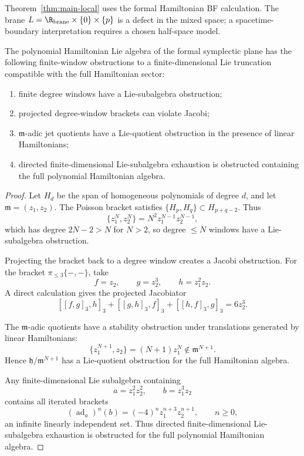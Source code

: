\documentclass[11pt]{memoir}
\begin{document}
\begin{rmk}
  Theorem~\ref{thm:main-local} uses the formal Hamiltonian BF
  calculation.  The brane
  \(L=\R_{\mathrm{brane}}\times\{0\}\times\{p\}\) is a defect in the
  mixed space; a spacetime-boundary interpretation requires a chosen
  half-space model.
\end{rmk}

\begin{lem}\label{lem:finite-window-hamiltonian-obstruction}
  The polynomial Hamiltonian Lie algebra of the formal symplectic plane has
  the following finite-window obstructions to a finite-dimensional Lie
  truncation compatible with the full Hamiltonian sector:
  \begin{enumerate}
    \item finite degree windows have a Lie-subalgebra obstruction;
    \item projected degree-window brackets can violate Jacobi;
    \item $\mathfrak m$-adic jet quotients have a Lie-quotient obstruction in the
      presence of linear Hamiltonians;
    \item directed finite-dimensional Lie-subalgebra exhaustion is obstructed
      containing the full polynomial Hamiltonian algebra.
  \end{enumerate}
\end{lem}

\begin{proof}
  Let $H_d$ be the span of homogeneous polynomials of degree $d$, and let
  $\mathfrak m=(z_1,z_2)$. The Poisson bracket satisfies
  $\{H_p,H_q\}\subset H_{p+q-2}$. Thus
  $$\{z_1^N,z_2^N\}=N^2z_1^{N-1}z_2^{N-1},$$
	  which has degree $2N-2>N$ for $N>2$, so degree $\leq N$ windows have
  a Lie-subalgebra obstruction.

	  Projecting the bracket back to a degree window creates a Jacobi obstruction.
  For the bracket $\pi_{\leq3}\{-,-\}$, take
  $$f=z_2,\qquad g=z_2^3,\qquad h=z_1^2z_2.$$
  A direct calculation gives the projected Jacobiator
  $$[[f,g]_3,h]_3+[[g,h]_3,f]_3+[[h,f]_3,g]_3=6z_2^3.$$

	  The $\mathfrak m$-adic quotients have a stability obstruction under translations generated
  by linear Hamiltonians:
  $$\{z_1^{N+1},z_2\}=(N+1)z_1^N\notin\mathfrak m^{N+1}.$$
	  Hence $\mathfrak h/\mathfrak m^{N+1}$ has a Lie-quotient obstruction for
  the full Hamiltonian algebra.

  Any finite-dimensional Lie subalgebra containing
  $$a=z_1^2z_2^2,\qquad b=z_1^3z_2$$
  contains all iterated brackets
  $$(\operatorname{ad}_a)^n(b)=(-4)^n z_1^{n+3}z_2^{n+1},\qquad n\geq0,$$
  an infinite linearly independent set. Thus directed finite-dimensional
  Lie-subalgebra exhaustion is obstructed for the full polynomial Hamiltonian
  algebra.
\end{proof}
\end{document}
